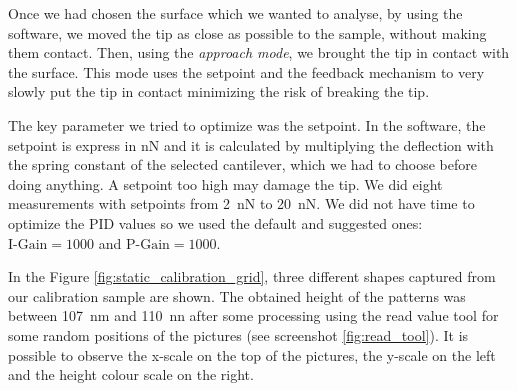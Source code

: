 \documentclass[11pt,a4paper]{article}
\begin{document}
Once we had chosen the surface which we wanted to analyse, by using the software, we moved the tip as close as possible to the sample, without making them contact. Then, using the \emph{approach mode}, we brought the tip in contact with the surface. This mode uses the setpoint and the feedback mechanism to very slowly put the tip in contact minimizing the risk of breaking the tip.

The key parameter we tried to optimize was the setpoint. In the software, the setpoint is express in \si{\nano N} and it is calculated by multiplying the deflection with the spring constant of the selected cantilever, which we had to choose before doing anything. A setpoint too high may damage the tip. We did eight measurements with setpoints from \SI{2}{\nano N} to \SI{20}{\nano N}. We did not have time to optimize the PID values so we used the default and suggested ones: $\text{I-Gain}=1000$ and $\text{P-Gain}=1000$.

In the Figure \ref{fig:static_calibration_grid}, three different shapes captured from our calibration sample are shown. The obtained height of the patterns was between \SI{107}{\nano m} and \SI{110}{\nano n} after some processing using the read value tool for some random positions of the pictures (see screenshot \ref{fig:read_tool}). It is possible to observe the x-scale on the top of the pictures, the y-scale on the left and the height colour scale on the right.
\end{document}

